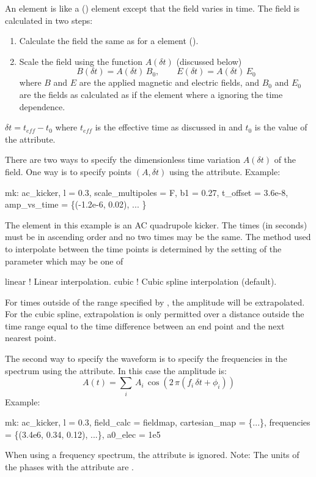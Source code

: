 An  element is like a  () element except that the field
varies in time. The field is calculated in two steps:
\begin{enumerate}
\item Calculate the field the same as for a  element ().
\item Scale the field using the function $A(\delta t)$ (discussed below)
\begin{equation}
  B(\delta t) = A(\delta t) \, B_0, \qquad E(\delta t) = A(\delta t) \, E_0
\end{equation}
where $B$ and $E$ are the applied magnetic and electric fields, and $B_0$ and $E_0$ are the fields
as calculated as if the element where a  ignoring the time dependence.
\end{enumerate}

$\delta t = t_{eff} - t_0$ where $t_{eff}$ is the effective time as discussed in 
and $t_0$ is the value of the  attribute.

There are two ways to specify the dimensionless time variation $A(\delta t)$ of the field. One way
is to specify points $(A, \delta t)$ using the  attribute. Example:
\begin{example}
  mk: ac_kicker, l = 0.3, scale_multipoles = F, b1 = 0.27, t_offset = 3.6e-8,
          amp_vs_time = \{(-1.2e-6, 0.02), ... \} 
\end{example}
The element in this example is an AC quadrupole kicker. The times (in seconds) must be in ascending
order and no two times may be the same. The method used to interpolate between the time points is
determined by the setting of the  parameter which may be one of
\begin{example}
  linear      ! Linear interpolation.
  cubic       ! Cubic spline interpolation (default).
\end{example}
For times outside of the range specified by , the amplitude will be extrapolated.
For the cubic spline, extrapolation is only permitted over a distance outside the time range equal
to the time difference between an end point and the next nearest point.

The second way to specify the waveform is to specify the frequencies in the spectrum using the
 attribute. In this case the amplitude is:
\begin{equation}
  A(t) = \sum_i \, A_i \, \cos( 2 \, \pi (f_i \, \delta t + \phi_i))
\end{equation}
Example:
\begin{example}
  mk: ac_kicker, l = 0.3, field_calc = fieldmap, cartesian_map = \{...\},
          frequencies = \{(3.4e6, 0.34, 0.12), ...\}, a0_elec = 1e5
\end{example}
When using a frequency spectrum, the  attribute is ignored. Note: The units of the
phases  with the  attribute are .

